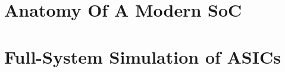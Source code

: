 \documentclass[phd]{ucbthesis}
\begin{document}
%

\chapter{Anatomy Of A Modern SoC}



\chapter{Full-System Simulation of ASICs}


%
%
%
%
%
%
%
%
%
%
%
%
%
%
%
%

\printbibliography
\end{document}
